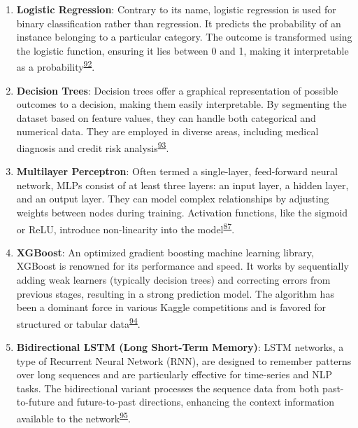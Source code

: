 \documentclass[
  10pt,
]{scrbook}
\begin{document}
\begin{enumerate}
\def\labelenumi{\arabic{enumi}.}
\item
  \textbf{Logistic Regression}: Contrary to its name, logistic
  regression is used for binary classification rather than regression.
  It predicts the probability of an instance belonging to a particular
  category. The outcome is transformed using the logistic function,
  ensuring it lies between 0 and 1, making it interpretable as a
  probability\textsuperscript{\protect\hyperlink{ref-cox_regression_1958}{92}}.
\item
  \textbf{Decision Trees}: Decision trees offer a graphical
  representation of possible outcomes to a decision, making them easily
  interpretable. By segmenting the dataset based on feature values, they
  can handle both categorical and numerical data. They are employed in
  diverse areas, including medical diagnosis and credit risk
  analysis\textsuperscript{\protect\hyperlink{ref-quinlan_1986}{93}}.
\item
  \textbf{Multilayer Perceptron}: Often termed a single-layer,
  feed-forward neural network, MLPs consist of at least three layers: an
  input layer, a hidden layer, and an output layer. They can model
  complex relationships by adjusting weights between nodes during
  training. Activation functions, like the sigmoid or ReLU, introduce
  non-linearity into the
  model\textsuperscript{\protect\hyperlink{ref-Goodfellow-et-al-2016}{87}}.
\item
  \textbf{XGBoost}: An optimized gradient boosting machine learning
  library, XGBoost is renowned for its performance and speed. It works
  by sequentially adding weak learners (typically decision trees) and
  correcting errors from previous stages, resulting in a strong
  prediction model. The algorithm has been a dominant force in various
  Kaggle competitions and is favored for structured or tabular
  data\textsuperscript{\protect\hyperlink{ref-xgboost}{94}}.
\item
  \textbf{Bidirectional LSTM (Long Short-Term Memory)}: LSTM networks, a
  type of Recurrent Neural Network (RNN), are designed to remember
  patterns over long sequences and are particularly effective for
  time-series and NLP tasks. The bidirectional variant processes the
  sequence data from both past-to-future and future-to-past directions,
  enhancing the context information available to the
  network\textsuperscript{\protect\hyperlink{ref-graves_2005}{95}}.
\end{enumerate}
\end{document}
